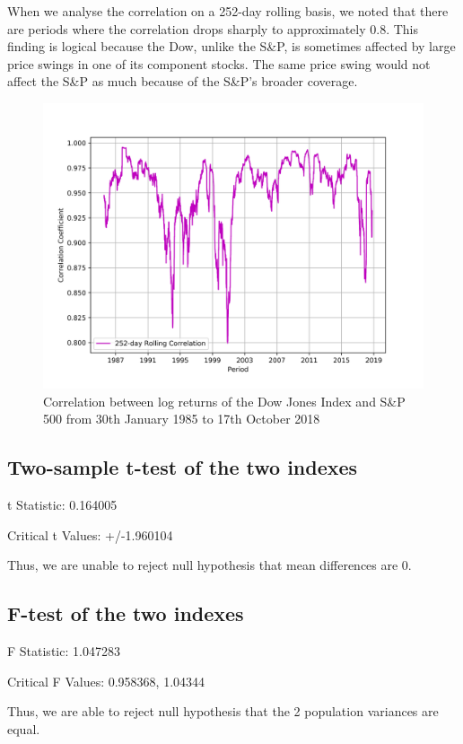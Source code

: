 \documentclass[a4paper]{article}
\begin{document}
	When we analyse the correlation on a 252-day rolling basis, we noted that there are periods where the correlation drops sharply to approximately 0.8. This finding is logical because the Dow, unlike the S\&P, is sometimes affected by large price swings in one of its component stocks. The same price swing would not affect the S\&P as much because of the S\&P’s broader coverage. 
	
	\begin{figure}[h!]
		\centering
		\includegraphics[width=0.8\linewidth]{correlation.png}
		\caption{Correlation between log returns of the Dow Jones Index and S\&P 500 from 30th January 1985 to 17th October 2018}
	\end{figure}
	
	\newpage
	\subsection{Two-sample t-test of the two indexes}
	\begin{flushleft}
		t Statistic: 0.164005
		
		Critical t Values: +/-1.960104
		
		Thus, we are unable to reject null hypothesis that mean differences are 0.
	\end{flushleft}
	
	\subsection{F-test of the two indexes}
	\begin{flushleft}
		F Statistic: 1.047283
		
		Critical F Values: 0.958368, 1.04344
		
		Thus, we are able to reject null hypothesis that the 2 population variances are equal.
	\end{flushleft}
	
	
\end{document}
